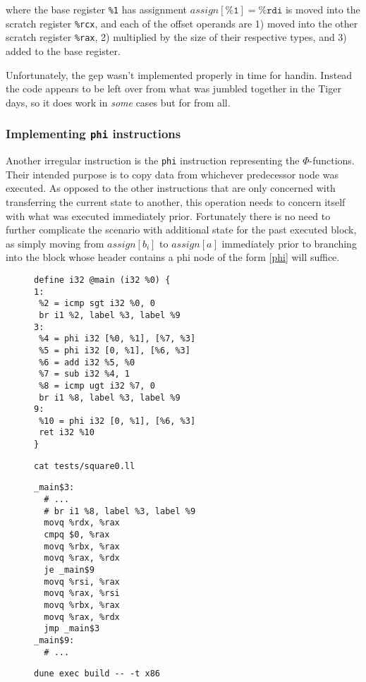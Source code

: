 \documentclass{article}
\begin{document}
\noindent where the base register  \texttt{\%1} has assignment \(\mathit{assign}[\texttt{\%1}] = \texttt{\%rdi}\) is moved into the scratch register \texttt{\%rcx}, and each of the offset operands are 1) moved into the other scratch register \texttt{\%rax}, 2) multiplied by the size of their respective types, and 3) added to the base register.

Unfortunately, the gep wasn't implemented properly in time for handin. Instead the code appears to be left over from what was jumbled together in the Tiger days, so it does work in \textit{some} cases but for from all.


\subsubsection{Implementing \texttt{phi} instructions}\label{impl-phi}
Another irregular instruction is the \texttt{phi} instruction representing the \(\Phi\)-functions. Their  intended purpose is to copy data from whichever predecessor node was executed.
As opposed to the other instructions that are only concerned with transferring the current state to another, this operation needs to concern itself with what was executed immediately prior.
Fortunately there is no need to further complicate the scenario with additional state for the past executed block, as simply moving from \(\mathit{assign}[b_i]\) to \(\mathit{assign}[a]\) immediately prior to branching into the block whose header contains a phi node of the form \eqref{phi} will suffice.

\begin{figure}[H]
   \begin{minipage}{0.48\textwidth}
     \centering
     \begin{verbatim}
define i32 @main (i32 %0) {
1:
 %2 = icmp sgt i32 %0, 0
 br i1 %2, label %3, label %9
3:
 %4 = phi i32 [%0, %1], [%7, %3]
 %5 = phi i32 [0, %1], [%6, %3]
 %6 = add i32 %5, %0
 %7 = sub i32 %4, 1
 %8 = icmp ugt i32 %7, 0
 br i1 %8, label %3, label %9
9:
 %10 = phi i32 [0, %1], [%6, %3]
 ret i32 %10
}
     \end{verbatim}
     \caption{\texttt{cat tests/square0.ll}}\label{fig:square0ll}
   \end{minipage}\hfill
   \begin{minipage}{0.48\textwidth}
     \centering
     \begin{verbatim}
_main$3:
  # ...
  # br i1 %8, label %3, label %9
  movq %rdx, %rax
  cmpq $0, %rax
  movq %rbx, %rax
  movq %rax, %rdx
  je _main$9
  movq %rsi, %rax
  movq %rax, %rsi
  movq %rbx, %rax
  movq %rax, %rdx
  jmp _main$3
_main$9:
  # ...
     \end{verbatim}
     \caption{\texttt{dune exec build -{}- -t x86}}\label{fig:square0s}
   \end{minipage}
\end{figure}
\end{document}
